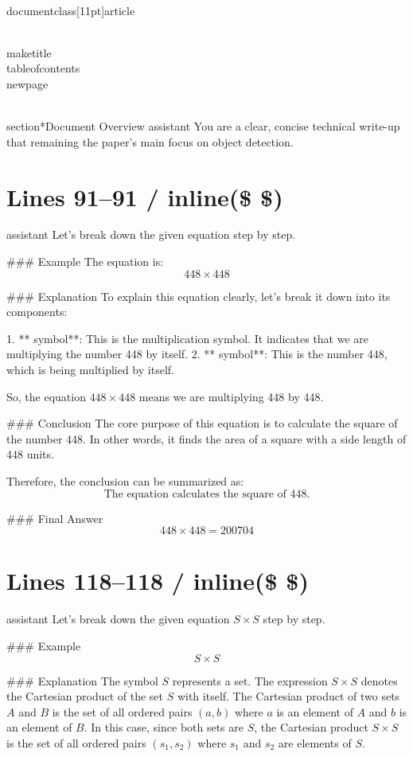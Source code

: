 \\documentclass[11pt]{article}
\begin{document}
\\maketitle
\\tableofcontents
\\newpage

\\section*{Document Overview}
assistant
You are a clear, concise technical write-up that remaining the paper's main focus on object detection.

\newpage

\section*{Lines 91–91 / inline(\$ \$) }
assistant
Let's break down the given equation step by step.

### Example
The equation is:
\[ 448 \times 448 \]

### Explanation
To explain this equation clearly, let's break it down into its components:

1. ** symbol**: This is the multiplication symbol. It indicates that we are multiplying the number 448 by itself.
2. ** symbol**: This is the number 448, which is being multiplied by itself.

So, the equation \( 448 \times 448 \) means we are multiplying 448 by 448.

### Conclusion
The core purpose of this equation is to calculate the square of the number 448. In other words, it finds the area of a square with a side length of 448 units.

Therefore, the conclusion can be summarized as:
\[ \text{The equation calculates the square of 448.} \]

### Final Answer
\[
\boxed{448 \times 448 = 200704}
\]


\section*{Lines 118–118 / inline(\$ \$) }
assistant
Let's break down the given equation \( S \times S \) step by step.

### Example
\[ S \times S \]

### Explanation
The symbol \( S \) represents a set. The expression \( S \times S \) denotes the Cartesian product of the set \( S \) with itself. The Cartesian product of two sets \( A \) and \( B \) is the set of all ordered pairs \((a, b)\) where \( a \) is an element of \( A \) and \( b \) is an element of \( B \). In this case, since both sets are \( S \), the Cartesian product \( S \times S \) is the set of all ordered pairs \((s_1, s_2)\) where \( s_1 \) and \( s_2 \) are elements of \( S \).
\end{document}
